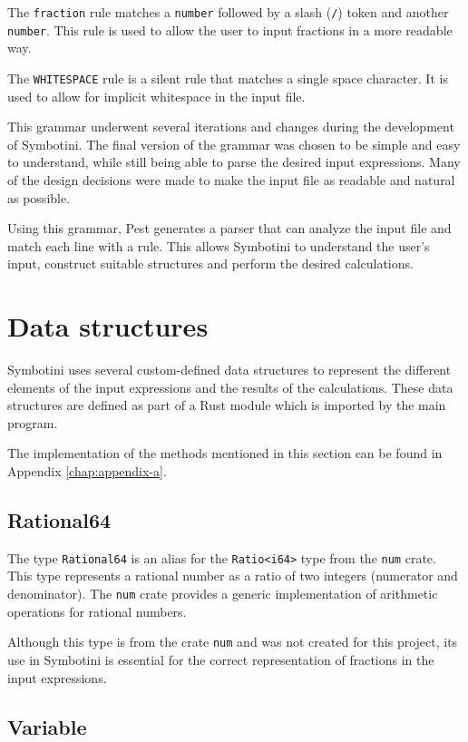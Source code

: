 The \verb|fraction| rule matches a \verb|number| followed by a slash (\verb|/|) token and another \verb|number|. This rule is used to allow the user to input fractions in a more readable way.

The \verb|WHITESPACE| rule is a silent rule that matches a single space character. It is used to allow for implicit whitespace in the input file.

This grammar underwent several iterations and changes during the development of Symbotini. The final version of the grammar was chosen to be simple and easy to understand, while still being able to parse the desired input expressions. Many of the design decisions were made to make the input file as readable and natural as possible.

Using this grammar, Pest generates a parser that can analyze the input file and match each line with a rule. This allows Symbotini to understand the user's input, construct suitable structures and perform the desired calculations.

\section{Data structures}\label{sec:data-structures}

Symbotini uses several custom-defined data structures to represent the different elements of the input expressions and the results of the calculations. These data structures are defined as part of a Rust module which is imported by the main program.

The implementation of the methods mentioned in this section can be found in Appendix \ref{chap:appendix-a}.

\subsection{Rational64}\label{subsec:ratio64}

The type \verb|Rational64| is an alias for the \verb|Ratio<i64>| type from the \verb|num| crate. This type represents a rational number as a ratio of two integers (numerator and denominator). The \verb|num| crate provides a generic implementation of arithmetic operations for rational numbers.

Although this type is from the crate \verb|num| and was not created for this project, its use in Symbotini is essential for the correct representation of fractions in the input expressions.

\subsection{Variable}\label{subsec:variable}


